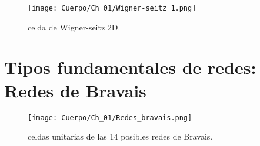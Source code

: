 \begin{figure}[h!] \centering
    \texttt{[image: Cuerpo/Ch\_01/Wigner-seitz\_1.png]}
    \caption{celda de Wigner-seitz 2D.}
    \label{Fig:01-01}
\end{figure}

 \section{Tipos fundamentales de redes: Redes de Bravais}

\begin{figure}[h!] \centering
    \texttt{[image: Cuerpo/Ch\_01/Redes\_bravais.png]}
    \caption{celdas unitarias de las 14 posibles redes de Bravais.}
    \label{Fig:01-02}
\end{figure}
